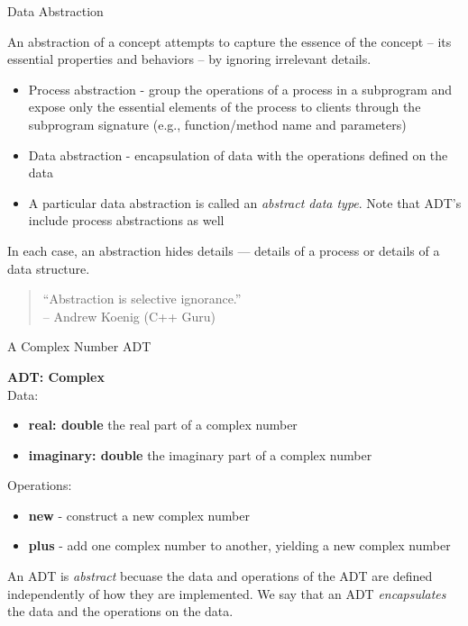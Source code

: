 \documentclass{beamer}
\author[Chris Simpkins]
{Christopher Simpkins \\\texttt{chris.simpkins@gatech.edu}}
\institute[Georgia Tech] %
\date{}
\begin{document}
\begin{frame}
  \titlepage
\end{frame}


\begin{frame}{Data Abstraction}


An abstraction of a concept attempts to capture the essence of the concept -- its essential properties and behaviors -- by ignoring irrelevant details.
\begin{itemize}
\item Process abstraction - group the operations of a process in a subprogram and expose only the essential elements of the process to clients through the subprogram signature (e.g., function/method name and parameters)
\item Data abstraction - encapsulation of data with the operations defined on the data
\item A particular data abstraction is called an {\em abstract data type}.  Note that ADT's include process abstractions as well
\end{itemize}

In each case, an abstraction hides details --- details of a process or details of a data structure.

\begin{quote}
``Abstraction is selective ignorance.''\\
-- Andrew Koenig (C++ Guru)
\end{quote}
\end{frame}

\begin{frame}[fragile]{A Complex Number ADT}


{\bf ADT: Complex}\\
Data:
\begin{itemize}
\item {\bf real: double} the real part of a complex number
\item {\bf imaginary: double} the imaginary part of a complex number
\end{itemize}
Operations:
\begin{itemize}
\item {\bf new} - construct a new complex number
\item {\bf plus} - add one complex number to another, yielding a new complex number
\end{itemize}
An ADT is {\it abstract} becuase the data and operations of the ADT are defined independently of how they are implemented.  We say that an ADT {\it encapsulates} the data and the operations on the data.

\end{frame}
\end{document}
